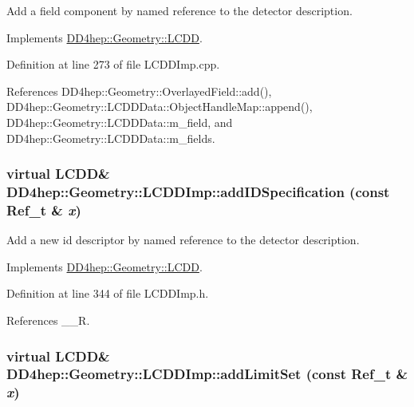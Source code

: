 Add a field component by named reference to the detector description. 

Implements \hyperlink{class_d_d4hep_1_1_geometry_1_1_l_c_d_d_a91ae6cfee73a663c46f296bc403b5c63}{DD4hep::Geometry::LCDD}.

Definition at line 273 of file LCDDImp.cpp.

References DD4hep::Geometry::OverlayedField::add(), DD4hep::Geometry::LCDDData::ObjectHandleMap::append(), DD4hep::Geometry::LCDDData::m\_\-field, and DD4hep::Geometry::LCDDData::m\_\-fields.\hypertarget{class_d_d4hep_1_1_geometry_1_1_l_c_d_d_imp_ac67bb4f3004262373f24c9f02431dbe0}{
\subsubsection[{addIDSpecification}]{\setlength{\rightskip}{0pt plus 5cm}virtual {\bf LCDD}\& DD4hep::Geometry::LCDDImp::addIDSpecification (const {\bf Ref\_\-t} \& {\em x})}}
\label{class_d_d4hep_1_1_geometry_1_1_l_c_d_d_imp_ac67bb4f3004262373f24c9f02431dbe0}


Add a new id descriptor by named reference to the detector description. 

Implements \hyperlink{class_d_d4hep_1_1_geometry_1_1_l_c_d_d_a93f80b4976e72a8a64d73baa6cf50a4d}{DD4hep::Geometry::LCDD}.

Definition at line 344 of file LCDDImp.h.

References \_\-\_\-R.\hypertarget{class_d_d4hep_1_1_geometry_1_1_l_c_d_d_imp_a846ba4e66d0a38eddaae795bf4b4b43b}{
\subsubsection[{addLimitSet}]{\setlength{\rightskip}{0pt plus 5cm}virtual {\bf LCDD}\& DD4hep::Geometry::LCDDImp::addLimitSet (const {\bf Ref\_\-t} \& {\em x})}}
\label{class_d_d4hep_1_1_geometry_1_1_l_c_d_d_imp_a846ba4e66d0a38eddaae795bf4b4b43b}


